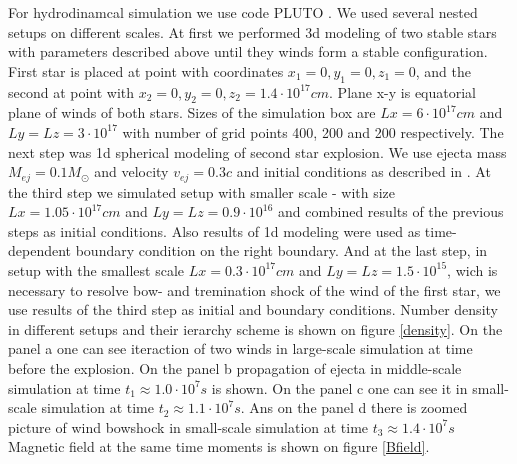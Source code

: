 \documentclass[a4paper,12pt]{extreport}
\begin{document}
For hydrodinamcal simulation we use code PLUTO \cite{MignonePluto}. We used several nested setups on different scales. At first we performed 3d modeling of two stable stars with parameters described above until they winds form a stable configuration. First star is placed at point with coordinates $x_1 = 0, y_1 = 0, z_1 = 0$, and the second at point with $x_2 = 0, y_2 = 0, z_2 = 1.4\cdot10^{17} cm$. Plane x-y is equatorial plane of winds of both stars. Sizes of the simulation box are $Lx = 6\cdot 10^{17} cm$ and $Ly = Lz = 3\cdot 10^{17}$ with number of grid points 400, 200 and 200 respectively. The next step was 1d spherical modeling of second star explosion. We use ejecta mass $M_{ej} = 0.1 M_\odot$ and velocity $v_{ej} = 0.3 c$ and initial conditions as described in \cite{}. At the third step we simulated setup with smaller scale - with size $Lx = 1.05\cdot 10^{17} cm$ and $Ly = Lz = 0.9\cdot 10^{16}$ and combined results of the previous steps as initial conditions. Also results of 1d modeling were used as time-dependent boundary condition on the right boundary. And at the last step, in setup with the smallest scale $Lx = 0.3\cdot 10^{17} cm$ and $Ly = Lz = 1.5\cdot 10^{15}$, wich is necessary to resolve bow- and tremination shock of the wind of the first star, we use results of the third step as initial and boundary conditions. Number density in different setups and their ierarchy scheme is shown on figure \ref{density}. On the panel a one can see iteraction of two winds in large-scale simulation at time before the explosion. On the panel b propagation of ejecta in middle-scale simulation at time $t_1 \approx 1.0\cdot10^7 s$ is shown. On the panel c one can see it in small-scale simulation at time $t_2 \approx 1.1\cdot10^7 s$. Ans on the panel d there is zoomed picture of wind bowshock in small-scale simulation at time $t_3 \approx 1.4\cdot10^7 s$ Magnetic field at the same time moments is shown on figure \ref{Bfield}.
\end{document}
